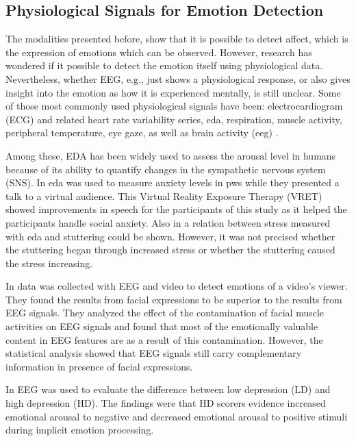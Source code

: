 \subsection{Physiological Signals for Emotion Detection}

The modalities presented before, show that it is possible to detect affect, which is the expression of emotions which can be observed. However, research has wondered if it possible to detect the emotion itself using physiological data. Nevertheless, whether EEG, e.g., just shows a physiological response, or also gives insight into the emotion as how it is experienced mentally, is still unclear. Some of those most commonly used physiological signals have been: electrocardiogram (ECG) and related heart rate variability series, \gls{eda}, respiration, muscle activity, peripheral temperature, eye gaze, as well as brain activity (\gls{eeg}) \cite{Wang2014}.


Among these, EDA has been widely used to assess the arousal level in humans because of its
ability to quantify changes in the sympathetic nervous system (SNS).
In \cite{Walkom2016virtual} \gls{eda} was used to measure anxiety levels in \gls{pws} while they presented a talk to a virtual audience. This Virtual Reality Exposure Therapy (VRET) showed improvements in speech for the participants of this study as it helped the participants handle social anxiety. Also in \cite{Shamsi2016} a relation between stress measured with \gls{eda} and stuttering could be shown. However, it was not precised whether the stuttering began through increased stress or whether the stuttering caused the stress increasing.

In \cite{Soleymani2016analysis} data was collected with EEG and video to detect emotions of a video's viewer. They found the results from facial expressions to be superior to the results from EEG signals. They analyzed the effect of the contamination of facial muscle activities on EEG signals and found that most of the emotionally valuable content in EEG features are as a result of this contamination. However, the statistical analysis showed that EEG signals still carry complementary information in presence of facial expressions.

In \cite{Bocharov2017depression} EEG was used to evaluate the difference between low depression (LD) and high depression (HD). The findings were that HD scorers evidence increased emotional arousal to negative and decreased emotional arousal to positive stimuli during implicit emotion processing. 

